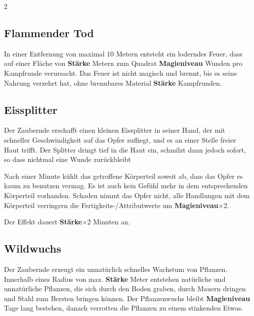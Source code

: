 \begin{multicols*}{2}
\subsection{Flammender Tod}

In einer Entfernung von maximal 10 Metern entsteht ein loderndes Feuer, dass auf einer Fläche von \textbf{Stärke} Metern zum Quadrat  \textbf{Magieniveau} Wunden pro Kampfrunde verursacht. Das Feuer ist nicht magisch und brennt, bis es seine Nahrung verzehrt hat, ohne brennbares Material \textbf{Stärke} Kampfrunden.



\subsection{Eissplitter}

Der Zaubernde erschafft einen kleinen Eissplitter in seiner Hand, der mit schneller Geschwindigkeit auf das Opfer zufliegt, und es an einer Stelle freier Haut trifft. Der Splitter dringt tief in die Haut ein, schmilzt dann jedoch sofort, so dass nichtmal eine Wunde zurückbleibt

Nach  einer Minute kühlt das getroffene Körperteil soweit ab, dass das Opfer es kaum zu benutzen vermag. Es ist auch kein Gefühl mehr in dem entsprechenden Körperteil vorhanden. Schaden nimmt das Opfer nicht, alle Handlungen mit dem Körperteil verringern die Fertigkeits-/Attributwerte um \textbf{Magieniveau}×2.

Der Effekt dauert \textbf{Stärke}×2 Minuten an.



\subsection{Wildwuchs}

Der Zaubernde erzeugt ein unnatürlich schnelles Wachstum von Pflanzen. Innerhalb eines Radius von max. \textbf{Stärke} Meter entstehen natürliche und unnatürliche Pflanzen, die sich durch den Boden graben, durch Mauern dringen und Stahl zum Bersten bringen können. Der Pflanzenwuchs bleibt \textbf{Magieniveau} Tage lang bestehen, danach verrotten die Pflanzen zu einem stinkenden Etwas.


\end{multicols*}
